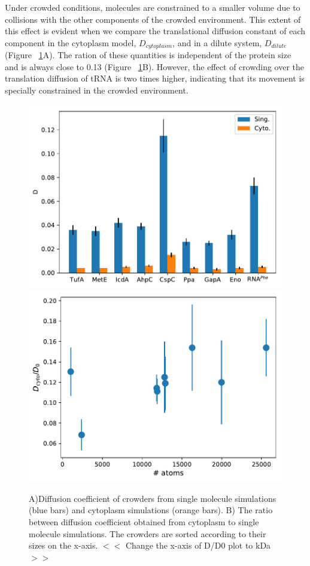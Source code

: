 \documentclass[journal=jacsat,manuscript=article]{achemso}
\begin{document}
Under crowded conditions, molecules are constrained to a smaller volume due to collisions with the other components of the crowded environment. This extent of this effect is evident when we compare the translational diffusion constant of each component in the cytoplasm model, $D_{cytoplasm}$, and in a dilute system, $D_{dilute}$ (Figure ~\ref{fig:translational_diffusion}A). The ration of these quantities is independent of the protein size and is always close to 0.13 (Figure ~\ref{fig:translational_diffusion}B). However, the effect of crowding over the translation diffusion of tRNA is two times higher, indicating that its movement is specially constrained in the crowded environment.

\begin{figure}[H]
\includegraphics[scale=0.5]{msd.pdf}
\includegraphics[scale=0.5]{diff_cyto_over_singles.pdf}
\caption{A)Diffusion coefficient of crowders from single molecule simulations (blue bars) and cytoplasm simulations (orange bars). B) The ratio between diffusion coefficient obtained from cytoplasm to single molecule simulations. The crowders are sorted according to their sizes on the x-axis. \colorbox{blue!50}{ $<<$ Change the x-axis of D/D0 plot to kDa $>>$ }}
\label{fig:translational_diffusion}
\end{figure}
\end{document}
